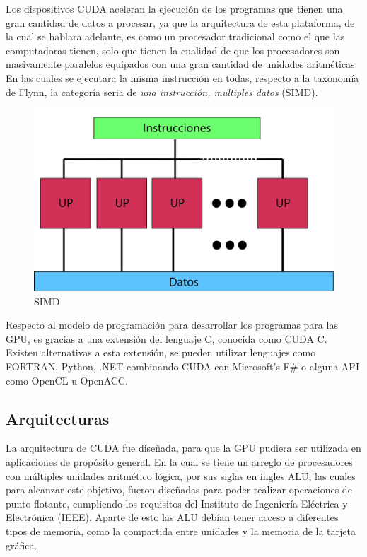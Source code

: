 Los dispositivos CUDA aceleran la ejecución de los programas que tienen una gran cantidad de datos a procesar, ya que la arquitectura de esta plataforma, de la cual se hablara adelante, es como un procesador tradicional como el que las computadoras tienen, solo que tienen la cualidad de que los procesadores son masivamente paralelos equipados con una gran cantidad de unidades aritméticas. En las cuales se ejecutara la misma instrucción en todas, respecto a la taxonomía de Flynn, la categoría seria de \textit{una instrucción, multiples datos} (SIMD). 

\begin{figure}[h]
			\centering
				\includegraphics[scale=0.1]{img/SIMD.jpg}
			\caption{SIMD}
\end{figure}


Respecto al modelo de programación para desarrollar los programas para las GPU, es gracias a una extensión del lenguaje C, conocida como CUDA C. Existen alternativas a esta extensión, se pueden utilizar lenguajes como FORTRAN, Python, .NET combinando CUDA con Microsoft's F\# o alguna API como OpenCL u OpenACC\cite{lenguajes}. 
 

\subsection{Arquitecturas}
La arquitectura de CUDA fue diseñada, para que la GPU pudiera ser utilizada en aplicaciones de propósito general. En la cual se tiene un arreglo de procesadores con múltiples unidades aritmético lógica, por sus siglas en ingles ALU, las cuales para alcanzar este objetivo, fueron diseñadas para poder realizar operaciones de punto flotante, cumpliendo los requisitos del Instituto de Ingeniería Eléctrica y Electrónica (IEEE). Aparte de esto las ALU debían tener acceso a diferentes tipos de memoria, como la compartida entre unidades y la memoria de la tarjeta gráfica. 

